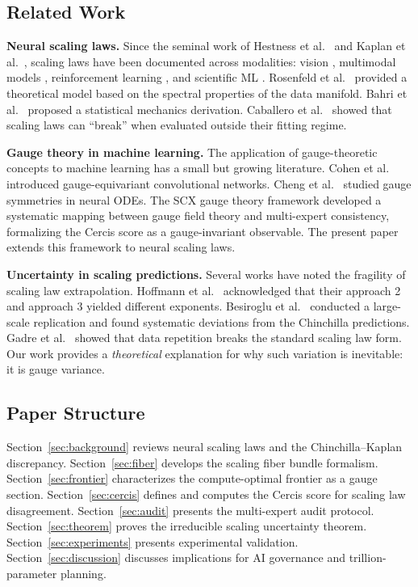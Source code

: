 \documentclass[12pt,a4paper]{article}
\theoremstyle{remark}
\begin{document}
\subsection{Related Work}

\textbf{Neural scaling laws.} Since the seminal work of Hestness et al.\ \cite{hestness2017deep} and Kaplan et al.\ \cite{kaplan2020scaling}, scaling laws have been documented across modalities: vision \cite{zhai2022scaling}, multimodal models \cite{cherti2023reproducible}, reinforcement learning \cite{hilton2023understanding}, and scientific ML \cite{batatia2022design}. Rosenfeld et al.\ \cite{rosenfeld2020construct} provided a theoretical model based on the spectral properties of the data manifold. Bahri et al.\ \cite{bahri2024explaining} proposed a statistical mechanics derivation. Caballero et al.\ \cite{caballero2023broken} showed that scaling laws can ``break'' when evaluated outside their fitting regime.

\textbf{Gauge theory in machine learning.} The application of gauge-theoretic concepts to machine learning has a small but growing literature. Cohen et al.\ \cite{cohen2019gauge} introduced gauge-equivariant convolutional networks. Cheng et al.\ \cite{cheng2019gauge} studied gauge symmetries in neural ODEs. The SCX gauge theory framework \cite{scx_gauge_formalized, scx_gauge_physics, scx_fiber_bundle} developed a systematic mapping between gauge field theory and multi-expert consistency, formalizing the Cercis score as a gauge-invariant observable. The present paper extends this framework to neural scaling laws.

\textbf{Uncertainty in scaling predictions.} Several works have noted the fragility of scaling law extrapolation. Hoffmann et al.\ \cite{hoffmann2022training} acknowledged that their approach 2 and approach 3 yielded different exponents. Besiroglu et al.\ \cite{besiroglu2024chinchilla} conducted a large-scale replication and found systematic deviations from the Chinchilla predictions. Gadre et al.\ \cite{gadre2024language} showed that data repetition breaks the standard scaling law form. Our work provides a \emph{theoretical} explanation for why such variation is inevitable: it is gauge variance.

\subsection{Paper Structure}

Section~\ref{sec:background} reviews neural scaling laws and the Chinchilla--Kaplan discrepancy. Section~\ref{sec:fiber} develops the scaling fiber bundle formalism. Section~\ref{sec:frontier} characterizes the compute-optimal frontier as a gauge section. Section~\ref{sec:cercis} defines and computes the Cercis score for scaling law disagreement. Section~\ref{sec:audit} presents the multi-expert audit protocol. Section~\ref{sec:theorem} proves the irreducible scaling uncertainty theorem. Section~\ref{sec:experiments} presents experimental validation. Section~\ref{sec:discussion} discusses implications for AI governance and trillion-parameter planning.
\end{document}
